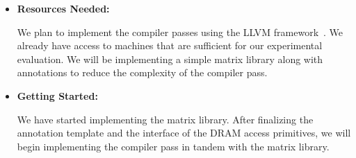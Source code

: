 \documentclass[letterpaper]{article}
\begin{document}
\begin{itemize}
\item \textbf{Resources Needed:}

We plan to implement the compiler passes using the LLVM framework~\cite{llvm}.
We already have access to machines that are sufficient for our experimental
evaluation. We will be implementing a simple matrix library along with
annotations to reduce the complexity of the compiler pass.

\item \textbf{Getting Started:}

We have started implementing the matrix library. After finalizing 
the annotation template and the interface of the DRAM access primitives, 
we will begin implementing the compiler pass in tandem with the matrix
library.
  
\end{itemize}



\end{document}
